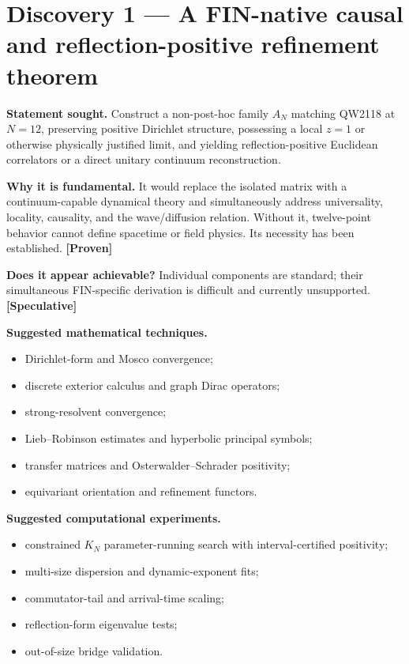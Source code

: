 \documentclass[11pt,a4paper,openany]{report}
\newcommand{\statusProven}{\textcolor{fingreen}{[Proven]}}
\newcommand{\statusSpeculative}{\textcolor{finorange}{[Speculative]}}
\begin{document}
\section{Discovery 1 — A FIN-native causal and reflection-positive refinement theorem}

\textbf{Statement sought.} Construct a non-post-hoc family \(A_N\) matching QW2118 at \(N=12\), preserving positive Dirichlet structure, possessing a local \(z=1\) or otherwise physically justified limit, and yielding reflection-positive Euclidean correlators or a direct unitary continuum reconstruction.

\textbf{Why it is fundamental.} It would replace the isolated matrix with a continuum-capable dynamical theory and simultaneously address universality, locality, causality, and the wave/\allowbreak{}diffusion relation. Without it, twelve-point behavior cannot define spacetime or field physics. Its necessity has been established. \textbf{\statusProven{}}

\textbf{Does it appear achievable?} Individual components are standard; their simultaneous FIN-specific derivation is difficult and currently unsupported. \textbf{\statusSpeculative{}}

\textbf{Suggested mathematical techniques.}

\begin{itemize}
\item 
Dirichlet-form and Mosco convergence;

\item 
discrete exterior calculus and graph Dirac operators;

\item 
strong-resolvent convergence;

\item 
Lieb–Robinson estimates and hyperbolic principal symbols;

\item 
transfer matrices and Osterwalder–Schrader positivity;

\item 
equivariant orientation and refinement functors.

\end{itemize}

\textbf{Suggested computational experiments.}

\begin{itemize}
\item 
constrained \(K_N\) parameter-running search with interval-certified positivity;

\item 
multi-size dispersion and dynamic-exponent fits;

\item 
commutator-tail and arrival-time scaling;

\item 
reflection-form eigenvalue tests;

\item 
out-of-size bridge validation.

\end{itemize}
\end{document}
